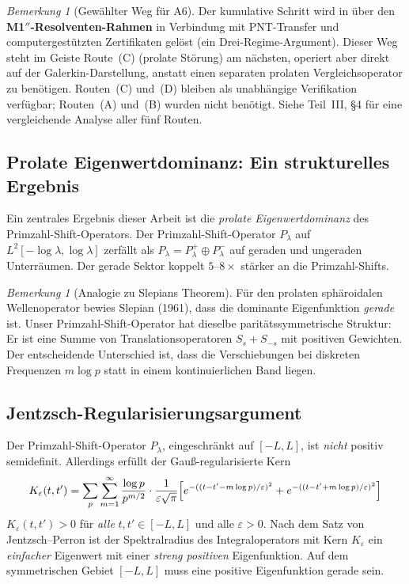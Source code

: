 \documentclass[12pt,a4paper]{article}
\theoremstyle{definition}
\theoremstyle{remark}
\newtheorem{remark}[theorem]{Bemerkung}
\begin{document}
\begin{remark}[Gewählter Weg für A6]
Der kumulative Schritt wird in  über den \textbf{M1$''$-Resolventen-Rahmen} in Verbindung mit PNT-Transfer und computergestützten Zertifikaten gelöst (ein Drei-Regime-Argument). Dieser Weg steht im Geiste Route~(C) (prolate Störung) am nächsten, operiert aber direkt auf der Galerkin-Darstellung, anstatt einen separaten prolaten Vergleichsoperator zu benötigen. Routen~(C) und~(D) bleiben als unabhängige Verifikation verfügbar; Routen~(A) und~(B) wurden nicht benötigt. Siehe Teil~III, \S4 für eine vergleichende Analyse aller fünf Routen.
\end{remark}

\subsection{Prolate Eigenwertdominanz: Ein strukturelles Ergebnis}

Ein zentrales Ergebnis dieser Arbeit ist die \emph{prolate Eigenwertdominanz} des Primzahl-Shift-Operators. Der Primzahl-Shift-Operator $P_\lambda$ auf $L^2[-\log\lambda, \log\lambda]$ zerfällt als $P_\lambda = P_\lambda^+ \oplus P_\lambda^-$ auf geraden und ungeraden Unterräumen. Der gerade Sektor koppelt $5$--$8\times$ stärker an die Primzahl-Shifts.

\begin{remark}[Analogie zu Slepians Theorem]
Für den prolaten sphäroidalen Wellenoperator bewies Slepian (1961), dass die dominante Eigenfunktion \emph{gerade} ist. Unser Primzahl-Shift-Operator hat dieselbe paritätssymmetrische Struktur: Er ist eine Summe von Translationsoperatoren $S_s + S_{-s}$ mit positiven Gewichten. Der entscheidende Unterschied ist, dass die Verschiebungen bei diskreten Frequenzen $m\log p$ statt in einem kontinuierlichen Band liegen.
\end{remark}

\subsection{Jentzsch-Regularisierungsargument}

Der Primzahl-Shift-Operator $P_\lambda$, eingeschränkt auf $[-L,L]$, ist \emph{nicht} positiv semidefinit. Allerdings erfüllt der Gauß-regularisierte Kern
\[ K_\varepsilon(t,t') = \sum_p \sum_{m=1}^\infty \frac{\log p}{p^{m/2}} \cdot \frac{1}{\varepsilon\sqrt\pi} \Bigl[e^{-((t-t'-m\log p)/\varepsilon)^2} + e^{-((t-t'+m\log p)/\varepsilon)^2}\Bigr] \]
$K_\varepsilon(t,t') > 0$ für \emph{alle} $t,t' \in [-L,L]$ und alle $\varepsilon > 0$. Nach dem Satz von Jentzsch--Perron ist der Spektralradius des Integraloperators mit Kern $K_\varepsilon$ ein \emph{einfacher} Eigenwert mit einer \emph{streng positiven} Eigenfunktion. Auf dem symmetrischen Gebiet $[-L,L]$ muss eine positive Eigenfunktion gerade sein.
\end{document}
